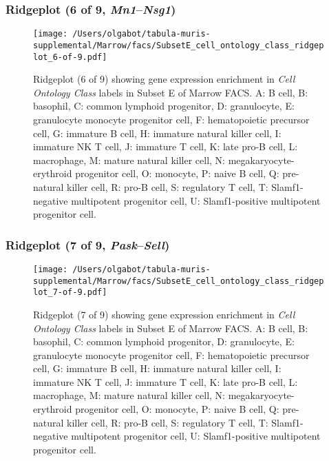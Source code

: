 \subsubsection{Ridgeplot (6 of 9, \emph{Mn1}--\emph{Nsg1})}
\begin{figure}[h]
\centering
\texttt{[image: /Users/olgabot/tabula-muris-supplemental/Marrow/facs/SubsetE\_cell\_ontology\_class\_ridgeplot\_6-of-9.pdf]}

\caption{ Ridgeplot (6 of 9)  showing gene expression enrichment in \emph{Cell Ontology Class} labels in Subset E of Marrow FACS. A: B cell, B: basophil, C: common lymphoid progenitor, D: granulocyte, E: granulocyte monocyte progenitor cell, F: hematopoietic precursor cell, G: immature B cell, H: immature natural killer cell, I: immature NK T cell, J: immature T cell, K: late pro-B cell, L: macrophage, M: mature natural killer cell, N: megakaryocyte-erythroid progenitor cell, O: monocyte, P: naive B cell, Q: pre-natural killer cell, R: pro-B cell, S: regulatory T cell, T: Slamf1-negative multipotent progenitor cell, U: Slamf1-positive multipotent progenitor cell.}
\end{figure}


\clearpage

\subsubsection{Ridgeplot (7 of 9, \emph{Pask}--\emph{Sell})}
\begin{figure}[h]
\centering
\texttt{[image: /Users/olgabot/tabula-muris-supplemental/Marrow/facs/SubsetE\_cell\_ontology\_class\_ridgeplot\_7-of-9.pdf]}

\caption{ Ridgeplot (7 of 9)  showing gene expression enrichment in \emph{Cell Ontology Class} labels in Subset E of Marrow FACS. A: B cell, B: basophil, C: common lymphoid progenitor, D: granulocyte, E: granulocyte monocyte progenitor cell, F: hematopoietic precursor cell, G: immature B cell, H: immature natural killer cell, I: immature NK T cell, J: immature T cell, K: late pro-B cell, L: macrophage, M: mature natural killer cell, N: megakaryocyte-erythroid progenitor cell, O: monocyte, P: naive B cell, Q: pre-natural killer cell, R: pro-B cell, S: regulatory T cell, T: Slamf1-negative multipotent progenitor cell, U: Slamf1-positive multipotent progenitor cell.}
\end{figure}


\clearpage

